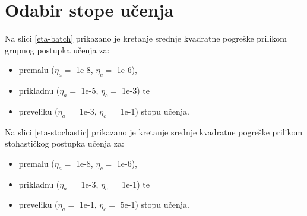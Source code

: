 \documentclass{article}
\begin{document}
\section{Odabir stope učenja}

Na slici \ref{eta-batch} prikazano je kretanje srednje kvadratne pogreške
prilikom grupnog postupka učenja za:
\begin{itemize}
    \item premalu ($ \eta_a =$ 1e-8, $ \eta_c =$ 1e-6),
    \item prikladnu ($ \eta_a =$ 1e-5, $ \eta_c =$ 1e-3) te
    \item preveliku ($ \eta_a =$ 1e-3, $ \eta_c =$ 1e-1) stopu učenja.
\end{itemize}
Na slici \ref{eta-stochastic} prikazano je kretanje srednje kvadratne pogreške
prilikom stohastičkog postupka učenja za:
\begin{itemize}
    \item premalu ($ \eta_a =$ 1e-8, $ \eta_c =$ 1e-6),
    \item prikladnu ($ \eta_a =$ 1e-3, $ \eta_c =$ 1e-1) te
    \item preveliku ($ \eta_a =$ 1e-1, $ \eta_c =$ 5e-1) stopu učenja.
\end{itemize}
\end{document}
